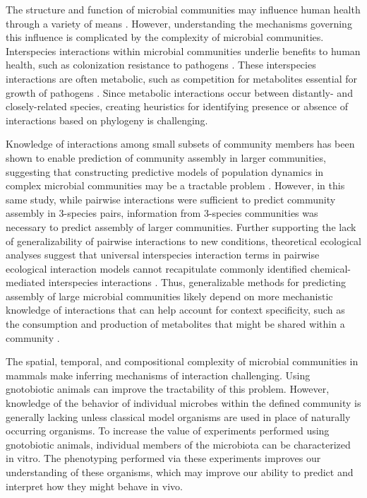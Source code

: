 \documentclass[11pt,onecolumn,notitlepage,openany,twoside]{book}
\begin{document}
\begin{refsection}
The structure and function of microbial communities may influence human health through a variety of means \cite{Turnbaugh2007-cd}. However, understanding the mechanisms governing this influence is complicated by the complexity of microbial communities. Interspecies interactions within microbial communities underlie benefits to human health, such as colonization resistance to pathogens \cite{Britton2014-wm, Buffie2013-xt}. These interspecies interactions are often metabolic, such as competition for metabolites essential for growth of pathogens \cite{Gillis2018-mt,Lawley2013-ez,Stecher2008-bc}. Since metabolic interactions occur between distantly-\cite{Fischbach2011-wg} and closely-related \cite{Rakoff-Nahoum2014-dw} species, creating heuristics for identifying presence or absence of interactions based on phylogeny is challenging.

Knowledge of interactions among small subsets of community members has been shown to enable prediction of community assembly in larger communities, suggesting that constructing predictive models of population dynamics in complex microbial communities may be a tractable problem \cite{Friedman2017-zn}. However, in this same study, while pairwise interactions were sufficient to predict community assembly in 3-species pairs, information from 3-species communities was necessary to predict assembly of larger communities. Further supporting the lack of generalizability of pairwise interactions to new conditions, theoretical ecological analyses suggest that universal interspecies interaction terms in pairwise ecological interaction models cannot recapitulate commonly identified chemical-mediated interspecies interactions \cite{Momeni2017-it}. Thus, generalizable methods for predicting assembly of large microbial communities likely depend on more mechanistic knowledge of interactions that can help account for context specificity, such as the consumption and production of metabolites that might be shared within a community \cite{Goldford2017-zx}.

The spatial, temporal, and compositional complexity of microbial communities in mammals make inferring mechanisms of interaction challenging. Using gnotobiotic animals can improve the tractability of this problem. However, knowledge of the behavior of individual microbes within the defined community is generally lacking unless classical model organisms are used in place of naturally occurring organisms. To increase the value of experiments performed using gnotobiotic animals, individual members of the microbiota can be characterized in vitro. The phenotyping performed via these experiments improves our understanding of these organisms, which may improve our ability to predict and interpret how they might behave in vivo.


\end{refsection}
\end{document}
